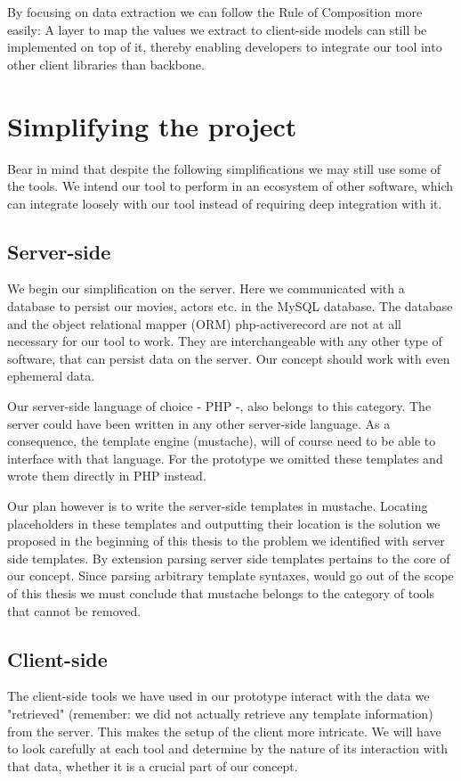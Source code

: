 \documentclass[thesis.tex]{subfiles}
\begin{document}
By focusing on data extraction we can follow the Rule of Composition more
easily: A layer to map the values we extract to client-side models can still be
implemented on top of it, thereby enabling developers to integrate our tool into
other client libraries than backbone.

\section{Simplifying the project}

Bear in mind that despite the following simplifications we may still use some
of the tools. We intend our tool to perform in an ecosystem of other software,
which can integrate loosely with our tool instead of requiring deep integration
with it.

\subsection{Server-side}
We begin our simplification on the server. Here we communicated with a database
to persist our movies, actors etc. in the MySQL database. The database and the
object relational mapper (ORM) php-activerecord are not at all necessary for our
tool to work. They are interchangeable with any other type of software, that can
persist data on the server. Our concept should work with even ephemeral data.

Our server-side language of choice - PHP -, also belongs to this category.
The server could have been written in any other server-side language.
As a consequence, the template engine (mustache), will of course need to be
able to interface with that language. For the prototype we omitted these
templates and wrote them directly in PHP instead.

Our plan however is to write the server-side templates in mustache.
Locating placeholders in these templates and outputting their location
is the solution we proposed in the beginning of this thesis to the problem
we identified with server side templates.
By extension parsing server side templates pertains to the core of our concept.
Since parsing arbitrary template syntaxes, would go out of the scope of this
thesis we must conclude that mustache belongs to the category of tools that
cannot be removed.

\subsection{Client-side}
The client-side tools we have used in our prototype interact with the data we
"retrieved" (remember: we did not actually retrieve any template information)
from the server. This makes the setup of the client more intricate. We will have
to look carefully at each tool and determine by the nature of its interaction
with that data, whether it is a crucial part of our concept.
\end{document}
